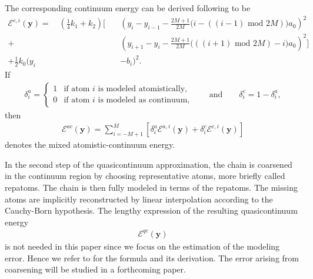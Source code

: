 \documentclass[11pt,reqno,oneside]{amsart}
\numberwithin{equation}{section}
\begin{document}
The corresponding continuum
energy can be derived following
\cite{ArndtLuskin:2007a} to be
\begin{equation}
\begin{split}
{\mathcal{E}}^{c,i}({\mathbf{y}}) = \quad \left( {{\textstyle \frac{1}{4}}} k_1 + k_2 \right) \Big[ \quad
  & \left( y_i - y_{i-1} - {\textstyle \frac{2M+1}{2M}} \big(i-\left(\left(i-1\right) \text{ mod } 2M\right)\big) a_0 \right)^2
    \\
+ & \left( y_{i+1} - y_i - {\textstyle \frac{2M+1}{2M}} \big(\left(\left(i+1\right) \text{ mod } 2M\right)-i\big) a_0 \right)^2 \Big] \\
+ {{\textstyle \frac{1}{2}}} k_0 ( y_i & - b_i )^2.
\end{split}
\end{equation}
 If
\begin{align}
\delta_i^a = \begin{cases}
  1 & \text{if atom $i$ is modeled atomistically,} \\
  0 & \text{if atom $i$ is modeled as continuum,}
\end{cases}
\qquad \text{and} \qquad \delta_i^c = 1-\delta_i^a,
\end{align}
then
\begin{align}
  {\mathcal{E}}^{ac}({\mathbf{y}}) = \sum_{i=-M+1}^M \left[
    \delta^a_i {\mathcal{E}}^{a,i}({\mathbf{y}}) + \delta^c_i {\mathcal{E}}^{c,i}({\mathbf{y}}) \right]
\end{align}
denotes the mixed atomistic-continuum energy.

In the second step of the quasicontinuum approximation, the chain is coarsened
in the continuum region by choosing representative atoms, more briefly called
repatoms.  The chain is then fully modeled in terms of the repatoms. The missing
atoms are implicitly reconstructed by linear interpolation according to the
Cauchy-Born hypothesis.  The lengthy expression of the resulting quasicontinuum
energy
\begin{align}
  {\mathcal{E}}^{qc}({\mathbf{y}})
\end{align}
is not needed in this paper since we focus on the estimation of the modeling
error. Hence we refer to \cite{ArndtLuskin:2007a} for
the formula and its derivation.  The error arising from coarsening will be
studied in a forthcoming paper.
\end{document}
